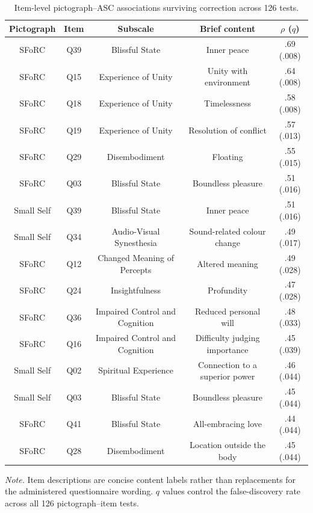 \documentclass[pdflatex,sn-basic,lineno]{../sn-jnl}
\begin{document}
\begin{table}[!htbp]
\centering
\footnotesize
\setlength{\tabcolsep}{3pt}
\caption{Item-level pictograph--ASC associations surviving correction across 126 tests.}
\label{tab:supp_pictograph_asc_items}
\begin{tabular*}{\textwidth}{@{\extracolsep{\fill}}ccccc@{}}
\toprule
Pictograph & Item & Subscale & Brief content & $\rho$ ($q$) \\
\midrule
SFoRC & Q39 & Blissful State & Inner peace & .69 (.008) \\
SFoRC & Q15 & Experience of Unity & Unity with environment & .64 (.008) \\
SFoRC & Q18 & Experience of Unity & Timelessness & .58 (.008) \\
SFoRC & Q19 & Experience of Unity & Resolution of conflict & .57 (.013) \\
SFoRC & Q29 & Disembodiment & Floating & .55 (.015) \\
SFoRC & Q03 & Blissful State & Boundless pleasure & .51 (.016) \\
Small Self & Q39 & Blissful State & Inner peace & .51 (.016) \\
Small Self & Q34 & Audio-Visual Synesthesia & Sound-related colour change & .49 (.017) \\
SFoRC & Q12 & Changed Meaning of Percepts & Altered meaning & .49 (.028) \\
SFoRC & Q24 & Insightfulness & Profundity & .47 (.028) \\
SFoRC & Q36 & Impaired Control and Cognition & Reduced personal will & .48 (.033) \\
SFoRC & Q16 & Impaired Control and Cognition & Difficulty judging importance & .45 (.039) \\
Small Self & Q02 & Spiritual Experience & Connection to a superior power & .46 (.044) \\
Small Self & Q03 & Blissful State & Boundless pleasure & .45 (.044) \\
SFoRC & Q41 & Blissful State & All-embracing love & .44 (.044) \\
SFoRC & Q28 & Disembodiment & Location outside the body & .45 (.044) \\
\bottomrule
\end{tabular*}
\par\smallskip
\parbox{\textwidth}{\footnotesize\textit{Note.} Item descriptions are concise content labels rather than replacements for the administered questionnaire wording. $q$ values control the false-discovery rate across all 126 pictograph--item tests.}
\end{table}
\FloatBarrier
\end{document}
